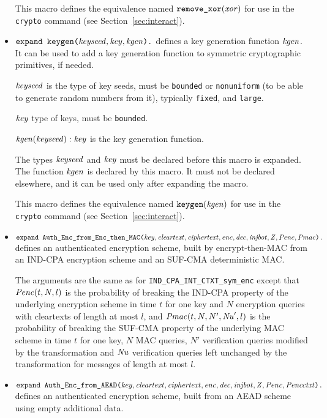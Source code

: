 \documentclass{article}
\begin{document}
\begin{itemize}
   This macro defines the equivalence named $\texttt{remove\_xor}(\mathit{xor})$
   for use in the \texttt{crypto} command 
   (see Section~\ref{sec:interact}).

\item $\texttt{expand\ keygen(}\mathit{keyseed}, \mathit{key}, \mathit{kgen}\texttt{).}$
defines a key generation function $\mathit{kgen}$. It can be used to add a key
generation function to symmetric cryptographic primitives, if needed.

$\mathit{keyseed}$ is the type of key seeds, must be \texttt{bounded} or \texttt{nonuniform} (to be able to generate random numbers from it), typically \texttt{fixed}, and \texttt{large}.

$\mathit{key}$ type of keys, must be \texttt{bounded}.

$\mathit{kgen}(\mathit{keyseed}): \mathit{key}$ is the key generation function.

The types $\mathit{keyseed}$ and $\mathit{key}$ must be declared before this
macro is expanded. The function $\mathit{kgen}$ is declared by this
macro. It must not be declared elsewhere, and it can be used only
after expanding the macro.

This macro defines the equivalence named $\texttt{keygen}(\mathit{kgen})$
   for use in the \texttt{crypto} command 
   (see Section~\ref{sec:interact}).

\item
  $\texttt{expand\ Auth\_Enc\_from\_Enc\_then\_MAC(}\vn{key}, \vn{cleartext}, \vn{ciphertext}, \vn{enc}, \vn{dec}, \vn{injbot}, \vn{Z}, \vn{Penc}, \vn{Pmac}\texttt{).}$ defines an authenticated encryption scheme, built by encrypt-then-MAC from an IND-CPA encryption scheme and an SUF-CMA deterministic MAC.

  The arguments are the same as for \texttt{IND\_CPA\_INT\_CTXT\_sym\_enc} except that $\mathit{Penc}(t, N, l)$ is the probability of breaking the IND-CPA
  property of the underlying encryption scheme in time $t$ for one key and $N$ encryption queries with
  cleartexts of length at most $l$, and
  $\mathit{Pmac}(t, N, N', \mathit{Nu}', l)$ is the probability of breaking the SUF-CMA
   property of the underlying MAC scheme in time $t$ for one key, $N$ MAC queries, $N'$ verification
   queries modified by the transformation and $\mathit{Nu}$ verification
   queries left unchanged by the transformation for messages of length at most $l$.

 \item 
   $\texttt{expand\ Auth\_Enc\_from\_AEAD(}\vn{key}, \vn{cleartext},
   \vn{ciphertext}, \vn{enc}, \vn{dec}, \vn{injbot}, \vn{Z},
   \vn{Penc}, \vn{Pencctxt}\texttt{).}$ defines an authenticated
   encryption scheme, built from an AEAD scheme using empty additional
   data.


\end{itemize}
\end{document}
